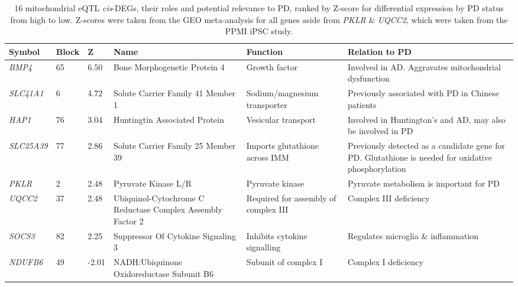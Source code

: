 \documentclass{article}
\begin{document}
\begin{landscape}
\begin{table}[]
\centering
\caption{16 mitochondrial eQTL \textit{cis}-DEGs, their roles and potential relevance to PD, ranked by Z-score for differential expression by PD status from high to low. Z-scores were taken from the GEO meta-analysis for all genes aside from \textit{PKLR} \& \textit{UQCC2}, which were taken from the PPMI iPSC study.}
\label{tab:16genes}
\begin{tabular}{|p{1.5cm}|p{1cm}|p{1cm}|p{5cm}|p{5cm}|p{8cm}|}
\hline
Symbol   & Block & Z     & Name  & Function  & Relation to PD \\ \hline
\textit{BMP4}     & 65    & 6.50  & Bone Morphogenetic Protein 4       & Growth factor  & Involved in AD\cite{Wang2023BMP4HRMECs}. Aggravates mitochondrial dysfunction\cite{Zhang2021BMP4Disease} \\ \hline
\textit{SLC41A1}  & 6     & 4.72  & Solute Carrier Family 41 Member   1  & Sodium/magnesium transporter  & Previously associated with PD in   Chinese patients\cite{Wang2015GeneticPatients}\\ \hline
\textit{HAP1}     & 76    & 3.04  & Huntingtin Associated Protein  & Vesicular transport   & Involved in Huntington's and AD, may also be involved in PD\cite{Chen2023Huntingtin-associatedDiseases} \\ \hline
\textit{SLC25A39} & 77    & 2.86  & Solute Carrier Family 25 Member   39 & Imports glutathione across IMM  & Previously detected as a candidate gene for PD\cite{Gialluisi2021IdentificationDisease}. Glutathione is needed for oxidative phosphorylation\cite{Wang2021SLC25A39Cells}   \\ \hline
\textit{PKLR}     & 2     & 2.48  & Pyruvate Kinase L/R   & Pyruvate kinase  & Pyruvate metabolism is important   for PD\cite{Gray2014RegulationDisease}  \\ \hline
\textit{UQCC2}    & 37    & 2.48  & Ubiquinol-Cytochrome C Reductase   Complex Assembly Factor 2 & Required for assembly of complex   III & Complex III deficiency\cite{Tucker2013MutationsExpression}\\ \hline
\textit{SOCS3}    & 82    & 2.25  & Suppressor Of Cytokine Signaling   3   & Inhibits cytokine   signalling     & Regulates microglia\cite{Wang2024SOCS3Macrophages} \&   inflammation\cite{Woo2015ControlDiseases}\\ \hline
\textit{NDUFB6}   & 49    & -2.01 & NADH:Ubiquinone Oxidoreductase Subunit B6 & Subunit of complex I  & Complex I deficiency\cite{Loublier2011TheLines} \\ \hline

\end{tabular}
\end{table}
\end{landscape}
\end{document}
